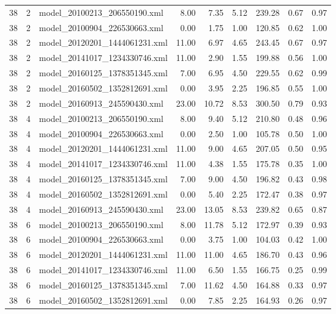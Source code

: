 \begin{table}[ht]
\begin{tabular}{rrlrrrrrr}
   38 &   2 & model\_20100213\_206550190.xml & 8.00 & 7.35 & 5.12 & 239.28 & 0.67 & 0.97 \\ 
   38 &   2 & model\_20100904\_226530663.xml & 0.00 & 1.75 & 1.00 & 120.85 & 0.62 & 1.00 \\ 
   38 &   2 & model\_20120201\_1444061231.xml & 11.00 & 6.97 & 4.65 & 243.45 & 0.67 & 0.97 \\ 
   38 &   2 & model\_20141017\_1234330746.xml & 11.00 & 2.90 & 1.55 & 199.88 & 0.56 & 1.00 \\ 
   38 &   2 & model\_20160125\_1378351345.xml & 7.00 & 6.95 & 4.50 & 229.55 & 0.62 & 0.99 \\ 
   38 &   2 & model\_20160502\_1352812691.xml & 0.00 & 3.95 & 2.25 & 196.85 & 0.55 & 1.00 \\ 
   38 &   2 & model\_20160913\_245590430.xml & 23.00 & 10.72 & 8.53 & 300.50 & 0.79 & 0.93 \\ 
   38 &   4 & model\_20100213\_206550190.xml & 8.00 & 9.40 & 5.12 & 210.80 & 0.48 & 0.96 \\ 
   38 &   4 & model\_20100904\_226530663.xml & 0.00 & 2.50 & 1.00 & 105.78 & 0.50 & 1.00 \\ 
   38 &   4 & model\_20120201\_1444061231.xml & 11.00 & 9.00 & 4.65 & 207.05 & 0.50 & 0.95 \\ 
   38 &   4 & model\_20141017\_1234330746.xml & 11.00 & 4.38 & 1.55 & 175.78 & 0.35 & 1.00 \\ 
   38 &   4 & model\_20160125\_1378351345.xml & 7.00 & 9.00 & 4.50 & 196.82 & 0.43 & 0.98 \\ 
   38 &   4 & model\_20160502\_1352812691.xml & 0.00 & 5.40 & 2.25 & 172.47 & 0.38 & 0.97 \\ 
   38 &   4 & model\_20160913\_245590430.xml & 23.00 & 13.05 & 8.53 & 239.82 & 0.65 & 0.87 \\ 
   38 &   6 & model\_20100213\_206550190.xml & 8.00 & 11.78 & 5.12 & 172.97 & 0.39 & 0.93 \\ 
   38 &   6 & model\_20100904\_226530663.xml & 0.00 & 3.75 & 1.00 & 104.03 & 0.42 & 1.00 \\ 
   38 &   6 & model\_20120201\_1444061231.xml & 11.00 & 11.00 & 4.65 & 186.70 & 0.43 & 0.96 \\ 
   38 &   6 & model\_20141017\_1234330746.xml & 11.00 & 6.50 & 1.55 & 166.75 & 0.25 & 0.99 \\ 
   38 &   6 & model\_20160125\_1378351345.xml & 7.00 & 11.62 & 4.50 & 164.88 & 0.33 & 0.97 \\ 
   38 &   6 & model\_20160502\_1352812691.xml & 0.00 & 7.85 & 2.25 & 164.93 & 0.26 & 0.97 \\ 

\end{tabular}
\end{table}
